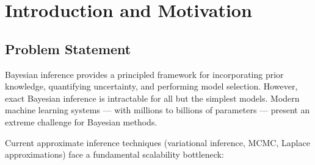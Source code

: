 \documentclass[
    language=english,
    doctype=dissertation-proposal,
    institution=none,
]{../../omnilatex}
\begin{document}
\maketitle

\begin{abstract}
This dissertation proposal outlines a research program investigating
\textit{Probabilistic Abstractions for Scalable Bayesian Inference in
High-Dimensional Models}. The proposed research addresses a fundamental
tension in modern machine learning: the need for principled uncertainty
quantification (provided by Bayesian methods) versus the computational
intractability of exact Bayesian inference in large-scale models.

The dissertation develops three interconnected research thrusts: (1) a
theoretical framework for constructing provably accurate probabilistic
abstractions of complex models, (2) scalable inference algorithms that
leverage these abstractions to achieve sublinear computational complexity,
and (3) empirical validation on real-world problems in climate science
and computational biology where uncertainty quantification is critical.

The expected contributions include new theory bridging information geometry
and approximate inference, open-source software for scalable Bayesian
computation, and applications demonstrating the practical utility of the
proposed methods.
\end{abstract}

\section{Introduction and Motivation}
\label{sec:introduction}

\subsection{Problem Statement}

Bayesian inference provides a principled framework for incorporating prior
knowledge, quantifying uncertainty, and performing model selection. However,
exact Bayesian inference is intractable for all but the simplest models.
Modern machine learning systems --- with millions to billions of parameters
--- present an extreme challenge for Bayesian methods.

Current approximate inference techniques (variational inference, MCMC, Laplace
approximations) face a fundamental scalability bottleneck:
\end{document}
